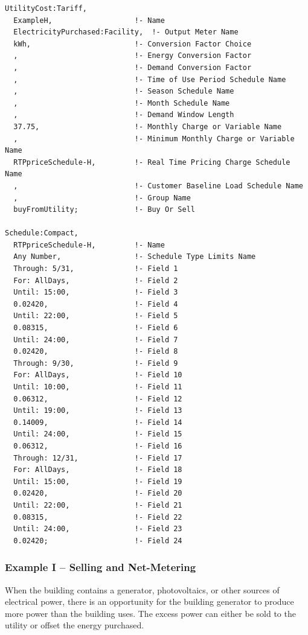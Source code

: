 \begin{lstlisting}
UtilityCost:Tariff,
  ExampleH,                   !- Name
  ElectricityPurchased:Facility,  !- Output Meter Name
  kWh,                        !- Conversion Factor Choice
  ,                           !- Energy Conversion Factor
  ,                           !- Demand Conversion Factor
  ,                           !- Time of Use Period Schedule Name
  ,                           !- Season Schedule Name
  ,                           !- Month Schedule Name
  ,                           !- Demand Window Length
  37.75,                      !- Monthly Charge or Variable Name
  ,                           !- Minimum Monthly Charge or Variable Name
  RTPpriceSchedule-H,         !- Real Time Pricing Charge Schedule Name
  ,                           !- Customer Baseline Load Schedule Name
  ,                           !- Group Name
  buyFromUtility;             !- Buy Or Sell

Schedule:Compact,
  RTPpriceSchedule-H,         !- Name
  Any Number,                 !- Schedule Type Limits Name
  Through: 5/31,              !- Field 1
  For: AllDays,               !- Field 2
  Until: 15:00,               !- Field 3
  0.02420,                    !- Field 4
  Until: 22:00,               !- Field 5
  0.08315,                    !- Field 6
  Until: 24:00,               !- Field 7
  0.02420,                    !- Field 8
  Through: 9/30,              !- Field 9
  For: AllDays,               !- Field 10
  Until: 10:00,               !- Field 11
  0.06312,                    !- Field 12
  Until: 19:00,               !- Field 13
  0.14009,                    !- Field 14
  Until: 24:00,               !- Field 15
  0.06312,                    !- Field 16
  Through: 12/31,             !- Field 17
  For: AllDays,               !- Field 18
  Until: 15:00,               !- Field 19
  0.02420,                    !- Field 20
  Until: 22:00,               !- Field 21
  0.08315,                    !- Field 22
  Until: 24:00,               !- Field 23
  0.02420;                    !- Field 24
\end{lstlisting}

\subsubsection{Example I -- Selling and Net-Metering}\label{example-i-selling-and-net-metering}

When the building contains a generator, photovoltaics, or other sources of electrical power, there is an opportunity for the building generator to produce more power than the building uses. The excess power can either be sold to the utility or offset the energy purchased.

